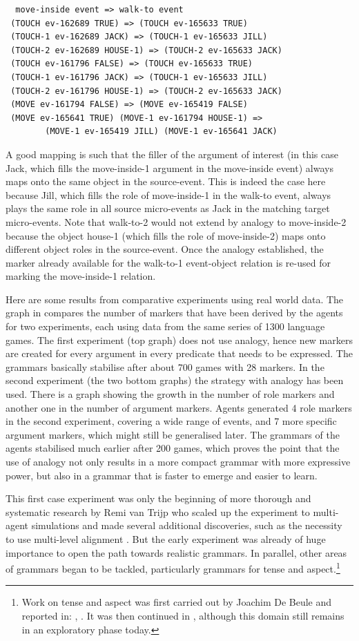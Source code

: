 \begin{verbatim}
  move-inside event => walk-to event
 (TOUCH ev-162689 TRUE) => (TOUCH ev-165633 TRUE)
 (TOUCH-1 ev-162689 JACK) => (TOUCH-1 ev-165633 JILL)
 (TOUCH-2 ev-162689 HOUSE-1) => (TOUCH-2 ev-165633 JACK)
 (TOUCH ev-161796 FALSE) => (TOUCH ev-165633 TRUE)
 (TOUCH-1 ev-161796 JACK) => (TOUCH-1 ev-165633 JILL)
 (TOUCH-2 ev-161796 HOUSE-1) => (TOUCH-2 ev-165633 JACK)
 (MOVE ev-161794 FALSE) => (MOVE ev-165419 FALSE)
 (MOVE ev-165641 TRUE) (MOVE-1 ev-161794 HOUSE-1) => 
        (MOVE-1 ev-165419 JILL) (MOVE-1 ev-165641 JACK)
\end{verbatim}
A good mapping is such that the filler of the argument of interest (in this case 
Jack, which fills the move-inside-1 argument in the move-inside event) always maps onto the same object in 
the source-event. This is indeed the case here because Jill, which fills the role of move-inside-1 
in the walk-to event, always plays the same role in all source micro-events as Jack in the matching target micro-events. 
Note that walk-to-2 would not extend by analogy to move-inside-2 because the object house-1 (which fills the role 
of move-inside-2) maps onto different object roles in the source-event. 
Once the analogy established, the marker already available for the walk-to-1 event-object relation is 
re-used for marking the move-inside-1 relation. 

Here are some results from comparative experiments using real world data. 
The graph in  compares the number of markers that have been derived by the agents for two experiments, 
each using data from the same series of 1300 language games. The first experiment (top graph) does not 
use analogy, hence new markers are created for every argument in every predicate
that needs to be expressed. The grammars basically stabilise after about 700 games with 28 markers. In the second 
experiment (the two bottom graphs) the strategy with analogy has been used. There is a graph showing the 
growth in the number of role markers and another one in the number of argument markers. Agents 
generated 4 role markers in the second experiment, covering a wide range of events, and 7 more 
specific argument markers, which might still be generalised later. The grammars of the agents stabilised
much earlier after 200 games, which proves the point that the use of analogy not only results in 
a more compact grammar with more expressive power, but also in a grammar that is faster to emerge and 
easier to learn.  

This first case experiment was only the beginning of more thorough and systematic research by Remi van Trijp who 
scaled up the experiment to multi-agent simulations and made several additional discoveries, such as the necessity 
to use multi-level alignment \citep{Steels:07d}. 
But the early experiment was already of huge importance to open the path towards realistic grammars. 
In parallel, other areas of grammars began to be tackled, 
particularly grammars for tense and aspect.\footnote{
Work on tense and aspect was first carried out by Joachim De Beule and reported in: \cite{DeBeule:2004}, \cite{DeBeule:2006}. 
It was then continued in \citep{Gerasymova:2012}, 
although this domain still remains in an exploratory phase today.}

